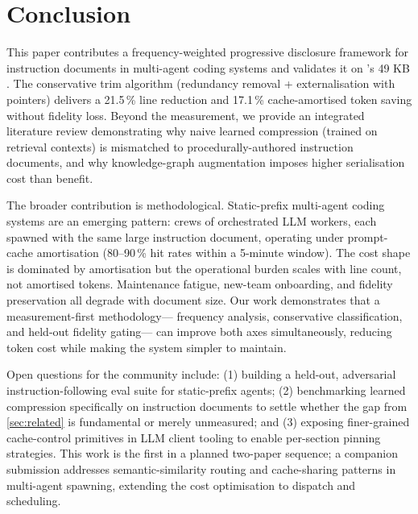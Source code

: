 \section{Conclusion}
\label{sec:conclusion}

This paper contributes a frequency-weighted progressive disclosure framework
for instruction documents in multi-agent coding systems and validates it on
\blackrim's 49 KB \claudemd. The conservative trim algorithm (redundancy removal
+ externalisation with pointers) delivers a 21.5\,\% line reduction and 17.1\,\%
cache-amortised token saving without fidelity loss. Beyond the measurement,
we provide an integrated literature review demonstrating why naive learned
compression (trained on retrieval contexts) is mismatched to procedurally-authored
instruction documents, and why knowledge-graph augmentation imposes higher
serialisation cost than benefit.

The broader contribution is methodological. Static-prefix multi-agent coding
systems are an emerging pattern: crews of orchestrated LLM workers, each spawned
with the same large instruction document, operating under prompt-cache amortisation
(80--90\,\% hit rates within a 5-minute window). The cost shape is dominated by
amortisation but the operational burden scales with line count, not amortised tokens.
Maintenance fatigue, new-team onboarding, and fidelity preservation all degrade
with document size. Our work demonstrates that a measurement-first methodology---
frequency analysis, conservative classification, and held-out fidelity gating---
can improve both axes simultaneously, reducing token cost while making the system
simpler to maintain.

Open questions for the community include: (1) building a held-out, adversarial
instruction-following eval suite for static-prefix agents; (2) benchmarking
learned compression specifically on instruction documents to settle whether the
gap from \cref{sec:related} is fundamental or merely unmeasured; and (3) exposing
finer-grained cache-control primitives in LLM client tooling to enable per-section
pinning strategies. This work is the first in a planned two-paper sequence; a
companion submission addresses semantic-similarity routing and cache-sharing
patterns in multi-agent spawning, extending the cost optimisation to dispatch
and scheduling.
